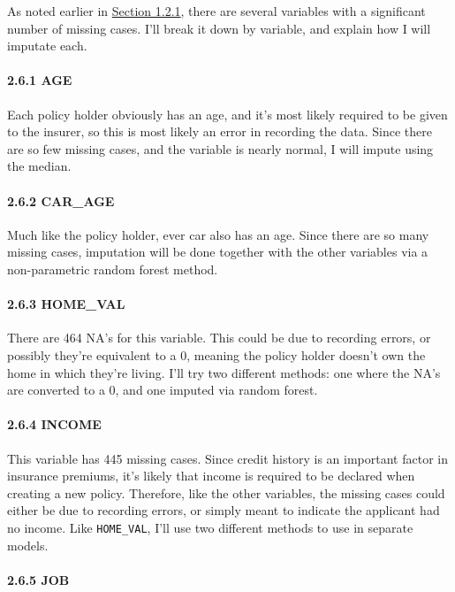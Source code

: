 \documentclass[]{article}
\let\oldparagraph\paragraph
\renewcommand{\paragraph}[1]{\oldparagraph{#1}\mbox{}}
\begin{document}
As noted earlier in \protect\hyperlink{missing-data}{Section 1.2.1},
there are several variables with a significant number of missing cases.
I'll break it down by variable, and explain how I will imputate each.

\paragraph{2.6.1 AGE}\label{age}

Each policy holder obviously has an age, and it's most likely required
to be given to the insurer, so this is most likely an error in recording
the data. Since there are so few missing cases, and the variable is
nearly normal, I will impute using the median.

\paragraph{2.6.2 CAR\_AGE}\label{car_age}

Much like the policy holder, ever car also has an age. Since there are
so many missing cases, imputation will be done together with the other
variables via a non-parametric random forest method.

\paragraph{2.6.3 HOME\_VAL}\label{home_val}

There are 464 NA's for this variable. This could be due to recording
errors, or possibly they're equivalent to a 0, meaning the policy holder
doesn't own the home in which they're living. I'll try two different
methods: one where the NA's are converted to a 0, and one imputed via
random forest.

\paragraph{2.6.4 INCOME}\label{income}

This variable has 445 missing cases. Since credit history is an
important factor in insurance premiums, it's likely that income is
required to be declared when creating a new policy. Therefore, like the
other variables, the missing cases could either be due to recording
errors, or simply meant to indicate the applicant had no income. Like
\texttt{HOME\_VAL}, I'll use two different methods to use in separate
models.

\paragraph{2.6.5 JOB}\label{job}
\end{document}
